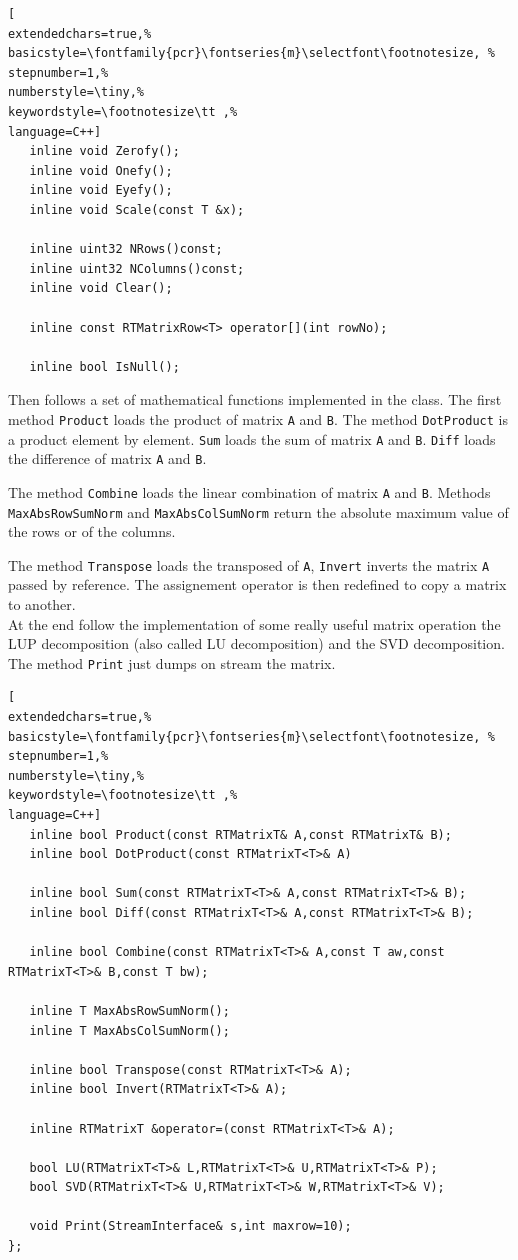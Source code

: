 \begin{lstlisting}[
extendedchars=true,%
basicstyle=\fontfamily{pcr}\fontseries{m}\selectfont\footnotesize, %
stepnumber=1,%
numberstyle=\tiny,%
keywordstyle=\footnotesize\tt ,%
language=C++]
   inline void Zerofy();
   inline void Onefy();
   inline void Eyefy();
   inline void Scale(const T &x);

   inline uint32 NRows()const;
   inline uint32 NColumns()const;
   inline void Clear();

   inline const RTMatrixRow<T> operator[](int rowNo);

   inline bool IsNull();
\end{lstlisting}

Then follows a set of mathematical functions implemented in the class. The first method \texttt{Product} loads the product of matrix \texttt{A} and \texttt{B}. The method \texttt{DotProduct} is a product element by element. \texttt{Sum} loads the sum of matrix \texttt{A} and \texttt{B}. \texttt{Diff} loads the difference of matrix \texttt{A} and \texttt{B}.

The method \texttt{Combine} loads the linear combination of matrix \texttt{A} and \texttt{B}. Methods \texttt{MaxAbsRowSumNorm} and \texttt{MaxAbsColSumNorm} return the absolute maximum value of the rows or of the columns.

The method \texttt{Transpose} loads the transposed of \texttt{A}, \texttt{Invert} inverts the matrix \texttt{A} passed by reference. The assignement operator is then redefined to copy a matrix to another. \\


At the end follow the implementation of some really useful matrix operation the LUP decomposition (also called LU decomposition) and the SVD decomposition. The method \texttt{Print} just dumps on stream the matrix.

\begin{lstlisting}[
extendedchars=true,%
basicstyle=\fontfamily{pcr}\fontseries{m}\selectfont\footnotesize, %
stepnumber=1,%
numberstyle=\tiny,%
keywordstyle=\footnotesize\tt ,%
language=C++]
   inline bool Product(const RTMatrixT& A,const RTMatrixT& B);
   inline bool DotProduct(const RTMatrixT<T>& A)

   inline bool Sum(const RTMatrixT<T>& A,const RTMatrixT<T>& B);
   inline bool Diff(const RTMatrixT<T>& A,const RTMatrixT<T>& B);

   inline bool Combine(const RTMatrixT<T>& A,const T aw,const RTMatrixT<T>& B,const T bw);

   inline T MaxAbsRowSumNorm();
   inline T MaxAbsColSumNorm();

   inline bool Transpose(const RTMatrixT<T>& A);
   inline bool Invert(RTMatrixT<T>& A);

   inline RTMatrixT &operator=(const RTMatrixT<T>& A);

   bool LU(RTMatrixT<T>& L,RTMatrixT<T>& U,RTMatrixT<T>& P);
   bool SVD(RTMatrixT<T>& U,RTMatrixT<T>& W,RTMatrixT<T>& V);

   void Print(StreamInterface& s,int maxrow=10);
};
\end{lstlisting}



